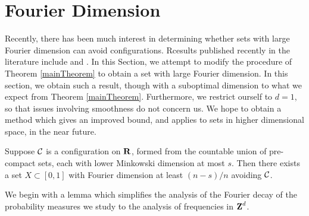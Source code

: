 \section{Fourier Dimension}

Recently, there has been much interest in determining whether sets with large Fourier dimension can avoid configurations. Rcesults published recently in the literature include \cite{PramanikLaba} and \cite{Shmerkin}. In this Section, we attempt to modify the procedure of Theorem \ref{mainTheorem} to obtain a set with large Fourier dimension. In this section, we obtain such a result, though with a suboptimal dimension to what we expect from Theorem \ref{mainTheorem}. Furthermore, we restrict ourself to $d = 1$, so that issues involving smoothness do not concern us. We hope to obtain a method which gives an improved bound, and applies to sets in higher dimensional space, in the near future.

\begin{theorem} \label{FourierTheorem}
    Suppose $\operatorname{\mathcal{C}}$ is a configuration on $\operatorname{\mathbf{R}}$, formed from the countable union of pre-compact sets, each with lower Minkowski dimension at most $s$. Then there exists a set $X \subset [0,1]$ with Fourier dimension at least $(n - s)/n$ avoiding $\operatorname{\mathcal{C}}$.
\end{theorem}

We begin with a lemma which simplifies the analysis of the Fourier decay of the probability measures we study to the analysis of frequencies in $\operatorname{\mathbf{Z}}^d$.

